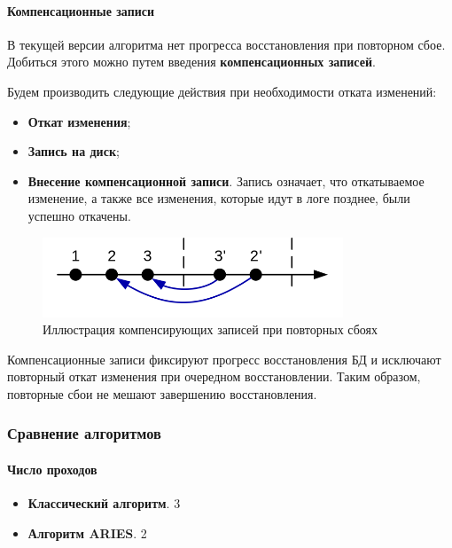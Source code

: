 \paragraph{Компенсационные записи}

В текущей версии алгоритма нет прогресса восстановления при повторном сбое. Добиться этого можно
путем введения \textbf{компенсационных записей}.

Будем производить следующие действия при необходимости отката изменений:

\begin{itemize}
	\item \textbf{Откат изменения};
	\item \textbf{Запись на диск};
	\item \textbf{Внесение компенсационной записи}. Запись означает, что откатываемое изменение, а
	      также все изменения, которые идут в логе позднее, были успешно откачены.
\end{itemize}

\begin{figure}[h]
	\centering
	\includegraphics[width=0.8\textwidth]{../assets/kgeorgiy/transactions/Recovery_ARIES.svg.png}
	\caption{Иллюстрация компенсирующих записей при повторных сбоях}
	\label{recovery-aries}
\end{figure}

\begin{proposition}
	Компенсационные записи фиксируют прогресс восстановления БД и исключают повторный откат изменения
	при очередном восстановлении. Таким образом, повторные сбои не мешают завершению восстановления.
\end{proposition}

\subsubsection{Сравнение алгоритмов}

\paragraph{Число проходов}

\begin{itemize}
	\item \textbf{Классический алгоритм}. 3
	\item \textbf{Алгоритм ARIES}. 2
\end{itemize}

